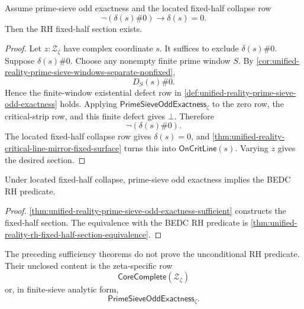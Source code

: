 \begin{theorem}
\label{thm:unified-reality-prime-sieve-odd-exactness-sufficient}
Assume prime-sieve odd exactness and the located fixed-half collapse row
$$
\neg(\delta(s)\#0)\to\delta(s)=0.
$$
Then the RH fixed-half section exists.
\end{theorem}

\begin{proof}
Let $z:\mathcal Z_{\zeta}$ have complex coordinate $s$.  It suffices to
exclude $\delta(s)\#0$.  Suppose $\delta(s)\#0$.  Choose any nonempty
finite prime window $S$.  By
\autoref{cor:unified-reality-prime-sieve-windows-separate-nonfixed},
$$
D_S(s)\#0.
$$
Hence the finite-window existential defect row in
\autoref{def:unified-reality-prime-sieve-odd-exactness} holds.  Applying
$\mathsf{PrimeSieveOddExactness}_{\zeta}$ to the zero row, the
critical-strip row, and this finite defect gives $\bot$.  Therefore
$$
\neg(\delta(s)\#0).
$$
The located fixed-half collapse row gives $\delta(s)=0$, and
\autoref{thm:unified-reality-critical-line-mirror-fixed-surface} turns
this into $\mathsf{OnCritLine}(s)$.  Varying $z$ gives the desired
section.
\end{proof}

\begin{corollary}
\label{cor:unified-reality-prime-sieve-exactness-conditionally-rh}
Under located fixed-half collapse, prime-sieve odd exactness implies the
BEDC RH predicate.
\end{corollary}

\begin{proof}
\autoref{thm:unified-reality-prime-sieve-odd-exactness-sufficient}
constructs the fixed-half section.  The equivalence with the BEDC RH
predicate is
\autoref{thm:unified-reality-rh-fixed-half-section-equivalence}.
\end{proof}

\begin{theorem}
\label{thm:unified-reality-conditional-rows-unclosed-content}
The preceding sufficiency theorems do not prove the unconditional RH
predicate.  Their unclosed content is the zeta-specific row
$$
\mathsf{CoreComplete}(\mathcal Z_{\zeta})
$$
or, in finite-sieve analytic form,
$$
\mathsf{PrimeSieveOddExactness}_{\zeta}.
$$
\end{theorem}

